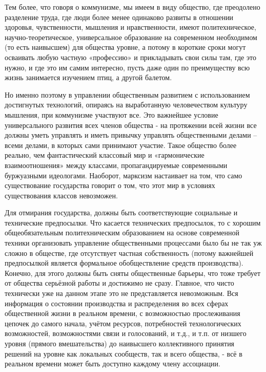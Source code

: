 \documentclass[12pt,a4paper,openany]{book}
\begin{document}
Тем более, что говоря о коммунизме, мы имеем в виду общество, где преодолено разделение труда, где люди более менее одинаково развиты в отношении здоровья, чувственности, мышления и нравственности, имеют политехническое, научно-теоретическое, универсальное образование на современном необходимом (то есть наивысшем) для общества уровне, а потому в короткие сроки могут осваивать любую частную «профессию» и прикладывать свои силы там, где это нужно, и где это им самим интересно, пусть даже один по преимуществу всю жизнь занимается изучением птиц, а другой балетом.

Но именно поэтому в управлении общественным развитием с использованием достигнутых технологий, опираясь на выработанную человечеством культуру мышления, при коммунизме участвуют все. Это важнейшее условие универсального развития всех членов общества - на протяжении всей жизни все должны уметь управлять и иметь привычку управлять общественными делами – всеми делами, в которых сами принимают участие. Такое общество более реально, чем фантастический классовый мир и «гармонические взаимоотношения» между классами, пропагандируемые современными буржуазными идеологами. Наоборот, марксизм настаивает на том, что само существование государства говорит о том, что этот мир в условиях существования классов невозможен.

Для отмирания государства, должны быть соответствующие социальные и технические предпосылки. Что касается технических предпосылок, то с хорошим общеобязательным политехническим образованием на основе современной техники организовать управление общественными процессами было бы не так уж сложно в обществе, где отсутствует частная собственность (потому важнейшей предпосылкой является формальное обобществление средств производства). Конечно, для этого должны быть сняты общественные барьеры, что тоже требует от общества серьёзной работы и достижимо не сразу. Главное, что чисто технически уже на данном этапе это не представляется невозможным. Вся информация о состоянии производства и распределения во всех сферах общественной жизни в реальном времени, с возможностью прослеживания цепочек до самого начала, учётом ресурсов, потребностей технологических возможностей, возможностями связи и голосований, и т.д., и т.п. от низшего уровня (прямого вмешательства) до наивысшего коллективного принятия решений на уровне как локальных сообществ, так и всего общества, - всё в реальном времени может быть доступно каждому члену ассоциации.
\end{document}
